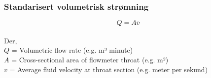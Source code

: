 \documentclass[aspectratio=169,xcolor=dvipsnames]{beamer}
\begin{document}
%
%
%
%
%
%
%
%
%
%
\begin{frame}
	\frametitle{Standarisert volumetrisk strømning}
$$Q = A \overline{v}$$
\\
Der,
\\
$Q$ = Volumetric flow rate (e.g. m³ minute)
\\
$A$ = Cross-sectional area of flowmeter throat (e.g. m²)
\\
$\overline{v}$ = Average fluid velocity at throat section (e.g. meter per sekund)
\end{frame}
\end{document}
